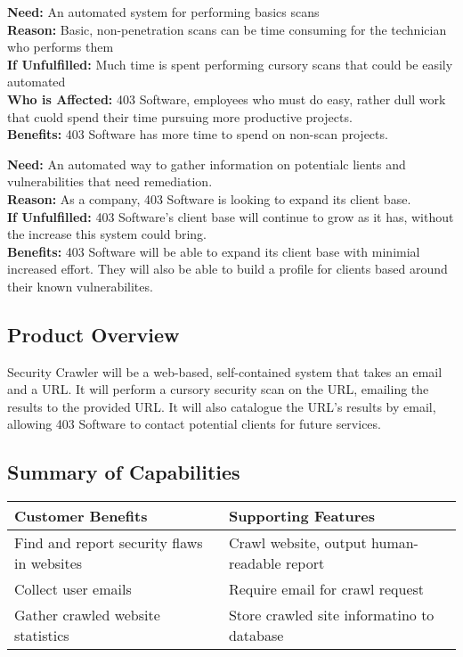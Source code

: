 \textbf{Need: }An automated system for performing basics scans\\
\textbf{Reason: }Basic, non-penetration scans can be time consuming for the technician who performs them\\\textbf{If Unfulfilled:	}Much time is spent performing cursory scans that could be easily automated\\\textbf{Who is Affected:	}403 Software, employees who must do easy, rather dull work that cuold spend their time pursuing more productive projects.\\\textbf{Benefits:	}403 Software has more time to spend on non-scan projects.


\textbf{Need: }An automated way to gather information on potentialc lients and vulnerabilities that need remediation.\\
\textbf{Reason:	}As a company, 403 Software is looking to expand its client base.\\
\textbf{If Unfulfilled:	}403 Software's client base will continue to grow as it has, without the increase this system could bring.\\
\textbf{Benefits: }403 Software will be able to expand its client base with minimial increased effort.  They will also be able to build a profile for clients based around their known vulnerabilites.

\subsection{Product Overview}

Security Crawler will be a web-based, self-contained system that takes an email and a URL.  It will perform a cursory security scan on the URL, emailing the results to the provided URL.  It will also catalogue the URL's results by email, allowing 403 Software to contact potential clients for future services.

\subsection{Summary of Capabilities}
\begin{tabularx}{\textwidth}{|X|X|}
    \hline
    {\bf Customer Benefits} & {\bf Supporting Features} \\ \hline
    Find and report security flaws in websites & Crawl website, output human-readable report \\ \hline
    Collect user emails & Require email for crawl request \\ \hline
    Gather crawled website statistics & Store crawled site informatino to database \\ \hline 
\end{tabularx}

